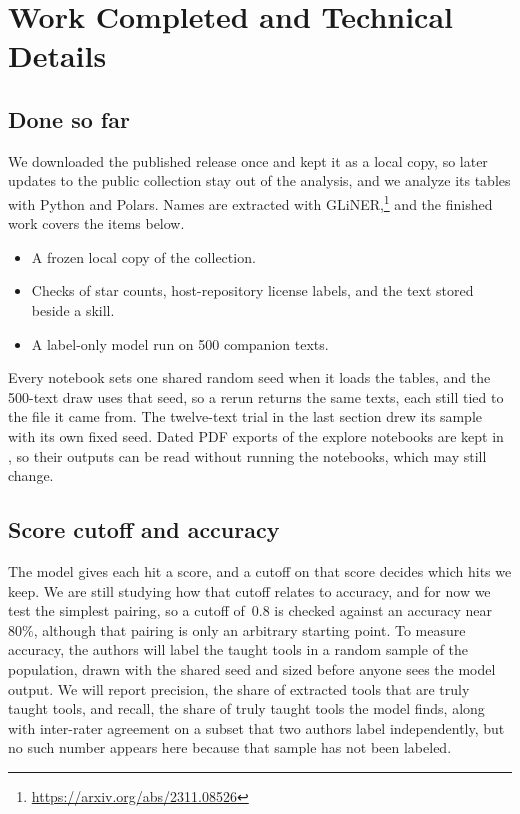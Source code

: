 \section{Work Completed and Technical Details}

\subsection{Done so far}

We downloaded the published release once and kept it as a local copy, so later updates to the public collection stay out of the analysis, and we analyze its tables with Python and Polars.
Names are extracted with GLiNER,\footnote{\url{https://arxiv.org/abs/2311.08526}} and the finished work covers the items below.

\begin{itemize}
  \item A frozen local copy of the collection.
  \item Checks of star counts, host-repository license labels, and the text stored beside a skill.
  \item A label-only model run on 500 companion texts.
\end{itemize}

Every notebook sets one shared random seed when it loads the tables, and the 500-text draw uses that seed, so a rerun returns the same texts, each still tied to the file it came from.
The twelve-text trial in the last section drew its sample with its own fixed seed.
Dated PDF exports of the explore notebooks are kept in , so their outputs can be read without running the notebooks, which may still change.

\subsection{Score cutoff and accuracy}

The model gives each hit a score, and a cutoff on that score decides which hits we keep.
We are still studying how that cutoff relates to accuracy, and for now we test the simplest pairing, so a cutoff of~$0.8$ is checked against an accuracy near~$80\%$, although that pairing is only an arbitrary starting point.
To measure accuracy, the authors will label the taught tools in a random sample of the population, drawn with the shared seed and sized before anyone sees the model output.
We will report precision, the share of extracted tools that are truly taught tools, and recall, the share of truly taught tools the model finds, along with inter-rater agreement on a subset that two authors label independently, but no such number appears here because that sample has not been labeled.
